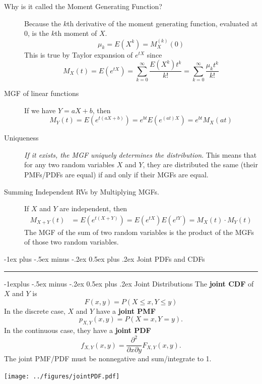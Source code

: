 \documentclass[10pt,landscape]{article}
\makeatletter
\renewcommand{\section}{\@startsection{section}{1}{0mm}%
{-1ex plus -.5ex minus -.2ex}%
{0.5ex plus .2ex}%
{\normalfont\large\bfseries}}
\renewcommand{\subsection}{\@startsection{subsection}{2}{0mm}%
{-1explus -.5ex minus -.2ex}%
{0.5ex plus .2ex}%
{\normalfont\normalsize\bfseries}}
\makeatother
\begin{document}
\begin{multicols*}{3}
\begin{description}
            \item[Why is it called the Moment Generating Function?] Because the $k$th derivative of the moment generating function, evaluated at $0$, is the $k$th moment of $X$.
            \[\mu_k = E(X^k) = M_X^{(k)}(0)\]
            This is true by Taylor expansion of $e^{tX}$ since
            \[M_X(t) = E(e^{tX}) = \sum_{k=0}^\infty \frac{E(X^k)t^k}{k!} = \sum_{k=0}^\infty \frac{\mu_k t^k}{k!} \]

            \item[MGF of linear functions] If we have $Y = aX + b$, then
            \[M_Y(t) = E(e^{t(aX + b)}) =  e^{bt}E(e^{(at)X}) = e^{bt}M_X(at)\]

            \item[Uniqueness] \emph{If it exists, the MGF uniquely determines the distribution}. This means that for any two random variables $X$ and $Y$, they are distributed the same (their PMFs/PDFs are equal) if and only if their MGFs are equal.

            \item[Summing Independent RVs by Multiplying MGFs.] If $X$ and $Y$ are independent, then
            \begin{align*}
                M_{X+Y}(t) & = E(e^{t(X + Y)}) = E(e^{tX})E(e^{tY}) = M_X(t) \cdot M_Y(t)
            \end{align*}
            The MGF of the sum of two random variables is the product of the MGFs of those two random variables.
        \end{description}


        \section{Joint PDFs and CDFs}\smallskip \hrule height 2pt \smallskip

        \subsection{Joint Distributions}
        The \textbf{joint CDF} of $X$ and $Y$ is
        $$F(x,y)=P(X \leq x, Y \leq y)$$
        In the discrete case, $X$ and $Y$ have a \textbf{joint PMF}
        $$p_{X,Y}(x,y) = P(X=x,Y=y).$$ In the continuous case, they have a \textbf{joint PDF}
        \[f_{X,Y}(x,y) = \frac{\partial^2}{\partial x \partial y} F_{X,Y}(x,y).\]
        The joint PMF/PDF must be nonnegative and sum/integrate to 1.
        \begin{minipage}{\linewidth}
            \centering
            \texttt{[image: ../figures/jointPDF.pdf]}
        \end{minipage}


\end{multicols*}
\end{document}
